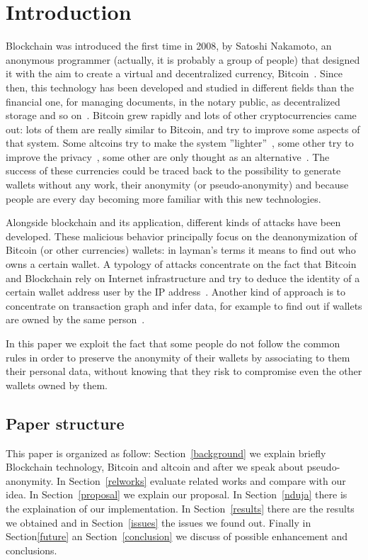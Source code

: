 \section{Introduction}
Blockchain was introduced the first time in 2008, by Satoshi Nakamoto, an
anonymous programmer (actually, it is probably a group of people) that
designed it with the aim to create a virtual and decentralized currency,
Bitcoin~\cite{bib:satoshi}. Since then, this technology has been developed and
studied in different fields than the financial one, for managing documents, in
the notary public, as decentralized storage and so on~\cite{air}. Bitcoin grew
rapidly and lots of other cryptocurrencies came out: lots of them are really
similar to Bitcoin, and try to improve some aspects of that system. Some
altcoins try to make the system ''lighter''~\cite{bib:litecoin:wiki}, some other try to improve the
privacy~\cite{bib:zerocoin:white_paper, bib:zerocash:white_paper, 
bib:monero:white_paper}, some other are only thought as an 
alternative~\cite{bib:dogecoin}. 
The success of these
currencies could be traced back to the possibility to generate wallets 
without any work,
their anonymity (or pseudo-anonymity) and because people are every day becoming
more familiar with this new technologies.

Alongside blockchain and its application, different kinds of attacks have
been developed. These malicious behavior principally focus on the
deanonymization of Bitcoin (or other currencies) wallets: in layman's terms 
it means to find out who owns a certain wallet. A typology of attacks 
concentrate on the fact that Bitcoin and Blockchain rely on Internet
infrastructure and try to deduce the identity of a certain wallet address
user by the IP address~\cite{bib:deanon}.
Another kind of approach is to concentrate on transaction graph and infer data,
for example to find out if wallets are owned by the same
person~\cite{bib:fistful}.

In this paper we exploit the fact that some people do not follow the common
rules in order to preserve the anonymity of their wallets by associating to them
their personal data, without knowing that they risk to compromise even the other
wallets owned by them.


\subsection{Paper structure}
This paper is organized as follow: Section~\ref{background} we explain briefly Blockchain
technology, Bitcoin and altcoin and after we speak about pseudo-anonymity. In
Section~\ref{relworks} evaluate related works and compare with our idea. In Section~\ref{proposal} we
explain our proposal. In Section~\ref{nduja} there is the explaination of our
implementation. In Section~\ref{results} there are the results we obtained and in Section~\ref{issues} the issues we found out. Finally in Section\ref{future} an Section~\ref{conclusion} we discuss
of possible enhancement and conclusions.
